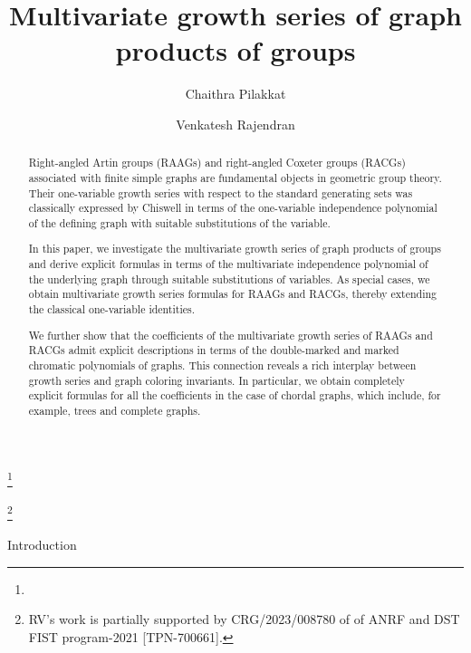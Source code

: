 \documentclass[11pt,reqno]{amsart}
\makeatletter
\numberwithin{equation}{section} %
\theoremstyle{definition}
\theoremstyle{remark}
\numberwithin{equation}{section}
\def\section{\def\@secnumfont{\mdseries}\@startsection{section}{1}%
  \z@{.7\linespacing\@plus\linespacing}{.5\linespacing}%
  {\normalfont\scshape\centering}}
\makeatother
\begin{document}
\title[]{Multivariate growth series of graph products of groups}

\author{Chaithra Pilakkat}
\address{Technical University of Munich, TUM School of Computation, Information and Technology, Department of Mathematics, Boltzmannstra\ss e~3, 85748 Garching bei M\"unchen, Germany.}
\thanks{}


\author{Venkatesh Rajendran}
\address{Department of Mathematics, Indian Institute of Science, Bangalore 560012, India}
\thanks{RV's work is partially supported by CRG/2023/008780 of of ANRF and DST FIST
program-2021 [TPN-700661].
}



\begin{abstract}
Right-angled Artin groups (RAAGs) and right-angled Coxeter groups (RACGs) associated with finite simple graphs are fundamental objects in geometric group theory. Their one-variable growth series with respect to the standard generating sets was classically expressed by Chiswell in terms of the one-variable independence polynomial of the defining graph \cite{Chiswell94} with suitable substitutions of the variable.

In this paper, we investigate the multivariate growth series of graph products of groups and derive explicit formulas in terms of the multivariate independence polynomial of the underlying graph through suitable substitutions of variables. As special cases, we obtain multivariate growth series formulas for RAAGs and RACGs, thereby extending the classical one-variable identities.

We further show that the coefficients of the multivariate growth series of RAAGs and RACGs admit explicit descriptions in terms of the double-marked and marked chromatic polynomials of graphs. This connection reveals a rich interplay between growth series and graph coloring invariants. In particular, we obtain completely explicit formulas for all the coefficients in the case of chordal graphs, which 
include, for example, trees and complete graphs.\end{abstract}

\maketitle

\section{Introduction}
\end{document}
